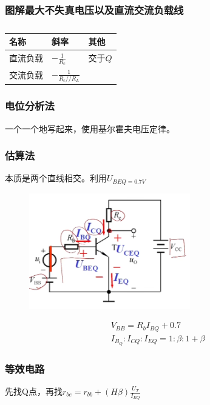 \subsubsection{图解最大不失真电压以及直流交流负载线}
\begin{table}[H]
      \centering
      \begin{tabular}{|m{2cm}<{\centering}|m{2cm}<{\centering}|m{2cm}<{\centering}|}
      \hline
          名称 & 斜率&其他\\ \hline
          直流负载&$\displaystyle -\frac{1}{R_c}$&交于$Q$\\ \hline
          交流负载&$\displaystyle -\frac{1}{R_c// R_L}$&\\  \hline
          
        \end{tabular}
        \caption{}
      \end{table}

\subsubsection{电位分析法}
一个一个地写起来，使用基尔霍夫电压定律。
\subsubsection{估算法}
本质是两个直线相交。利用$U_{BEQ=0.7V}$
        \begin{figure}[H]
            \centering
            \includegraphics[width=7cm]{img/2.8.png}
            \end{figure}
\begin{align}
    V_{BB}=R_bI_{BQ}+0.7 \tag{3.2.a} \\
    I_{B_Q}:I_{CQ}:I_{EQ}=1:\beta:1+\beta\tag{3.2.b}
\end{align}

\subsubsection{等效电路}
先找Q点，再找$\displaystyle r_{be}=r_{bb}+(H\beta)\frac{U_T}{I_{EQ}}$

